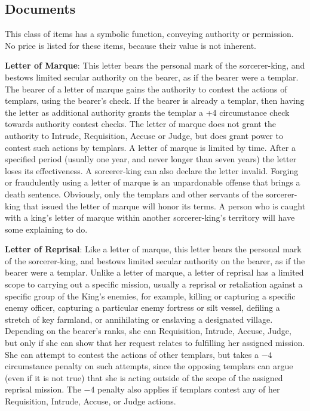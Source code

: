\subsection{Documents}
This class of items has a symbolic function, conveying authority or permission. No price is listed for these items, because their value is not inherent.

\textbf{Letter of Marque}: This letter bears the personal mark of the sorcerer-king, and bestows limited secular authority on the bearer, as if the bearer were a templar. The bearer of a letter of marque gains the authority to contest the actions of templars, using the bearer's  check. If the bearer is already a templar, then having the letter as additional authority grants the templar a +4 circumstance check towards authority contest checks. The letter of marque does not grant the authority to Intrude, Requisition, Accuse or Judge, but does grant power to contest such actions by templars. A letter of marque is limited by time. After a specified period (usually one year, and never longer than seven years) the letter loses its effectiveness. A sorcerer-king can also declare the letter invalid. Forging or fraudulently using a letter of marque is an unpardonable offense that brings a death sentence. Obviously, only the templars and other servants of the sorcerer-king that issued the letter of marque will honor its terms. A person who is caught with a king's letter of marque within another sorcerer-king's territory will have some explaining to do.

\textbf{Letter of Reprisal}: Like a letter of marque, this letter bears the personal mark of the sorcerer-king, and bestows limited secular authority on the bearer, as if the bearer were a templar. Unlike a letter of marque, a letter of reprisal has a limited scope to carrying out a specific mission, usually a reprisal or retaliation against a specific group of the King's enemies, for example, killing or capturing a specific enemy officer, capturing a particular enemy fortress or silt vessel, defiling a stretch of key farmland, or annihilating or enslaving a designated village. Depending on the bearer's  ranks, she can Requisition, Intrude, Accuse, Judge, but only if she can show that her request relates to fulfilling her assigned mission. She can attempt to contest the actions of other templars, but takes a $-4$ circumstance penalty on such attempts, since the opposing templars can argue (even if it is not true) that she is acting outside of the scope of the assigned reprisal mission. The $-4$ penalty also applies if templars contest any of her Requisition, Intrude, Accuse, or Judge actions.